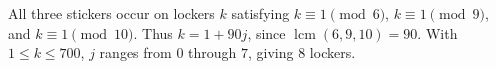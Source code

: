 All three stickers occur on lockers $k$ satisfying $k\equiv1\pmod6$, $k\equiv1\pmod9$, and $k\equiv1\pmod{10}$. Thus $k=1+90j$, since $\operatorname{lcm}(6,9,10)=90$. With $1\le k\le700$, $j$ ranges from 0 through $7$, giving $\boxed{8}$ lockers.
